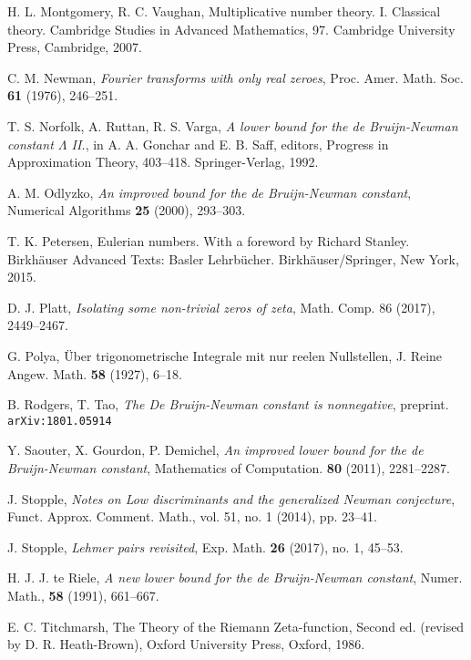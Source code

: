 \documentclass[a4paper,11pt,twoside]{amsart}
\begin{document}
\begin{thebibliography}{99}
H. L. Montgomery, R. C. Vaughan, Multiplicative number theory. I. Classical theory. Cambridge Studies in Advanced Mathematics, 97. Cambridge University Press, Cambridge, 2007.

C. M. Newman, \emph{Fourier transforms with only real zeroes}, Proc. Amer. Math. Soc. \textbf{61} (1976), 246--251.

T. S. Norfolk, A. Ruttan, R. S. Varga, \emph{A lower bound for the de Bruijn-Newman
constant $\Lambda$ II.}, in A. A. Gonchar and E. B. Saff, editors, Progress in Approximation
Theory, 403--418. Springer-Verlag, 1992.

A. M. Odlyzko, \emph{An improved bound for the de Bruijn-Newman constant}, Numerical Algorithms \textbf{25} (2000), 293--303.

T. K. Petersen, Eulerian numbers.  With a foreword by Richard Stanley. Birkh\"auser Advanced Texts: Basler Lehrb\"ucher. Birkh\"auser/Springer, New York, 2015.

D. J. Platt, \emph{Isolating some non-trivial zeros of zeta}, Math. Comp. 86 (2017), 2449--2467.

G. Polya, {\"Uber trigonometrische Integrale mit nur reelen Nullstellen}, J. Reine Angew. Math. \textbf{58} (1927), 6--18. 

B. Rodgers, T. Tao, \emph{The De Bruijn-Newman constant is nonnegative}, preprint. {\tt arXiv:1801.05914}

Y. Saouter, X. Gourdon, P. Demichel, \emph{An improved lower bound for the de Bruijn-Newman constant}, Mathematics of Computation. \textbf{80} (2011), 2281--2287. 

J. Stopple, \emph{Notes on Low discriminants and the generalized Newman conjecture}, Funct. Approx. Comment.
Math., vol. 51, no. 1 (2014), pp. 23--41.

J. Stopple, \emph{Lehmer pairs revisited}, Exp. Math. \textbf{26} (2017), no. 1, 45--53. 

H. J. J. te Riele, \emph{A new lower bound for the de Bruijn-Newman constant}, Numer. Math., \textbf{58} (1991), 661--667.

E. C. Titchmarsh, The Theory of the Riemann Zeta-function, Second ed. (revised by D. R. Heath-Brown), Oxford University Press, Oxford, 1986.	


\end{thebibliography} 
\end{document}
